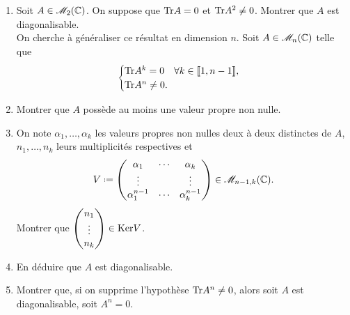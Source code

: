 \begin{exercice}
    \begin{enumerate}
        \item Soit $A \in \mathscr{M}_2(\mathbb{C})$. On suppose que $\mathrm{Tr}{A} = 0$ et $\mathrm{Tr}{A}^2 \not=0$. Montrer que $A$ est diagonalisable. \\
        On cherche à généraliser ce résultat en dimension $n$. Soit $A \in \mathscr{M}_n(\mathbb{C})$ telle que
        $$
        \begin{cases}
            \mathrm{Tr}{A^k}= 0 \quad \forall k \in \llbracket 1, n-1 \rrbracket, \\
            \mathrm{Tr}{A^n}\not=0.
        \end{cases}
        $$
        \item Montrer que $A$ possède au moins une valeur propre non nulle. 
        \item On note $\alpha_1, \dots, \alpha_k$ les valeurs propres non nulles deux à deux distinctes de $A$, $n_1, \dots, n_k$ leurs multiplicités respectives et 
        $$
        V \defeq \begin{pmatrix}
            \alpha_1 & \cdots & \alpha_k \\
            \vdots & & \vdots \\
            \alpha_1^{n-1} & \cdots & \alpha_k^{n-1}
        \end{pmatrix}
        \in \M_{n-1,k}(\C).
        $$
        Montrer que $\begin{pmatrix} n_1  \\ \vdots \\ n_k \end{pmatrix} \in \mathrm{Ker}{V}$.
        \item En déduire que $A$ est diagonalisable.
        \item Montrer que, si on supprime l'hypothèse $\mathrm{Tr}{A^n} \not=0$, alors soit $A$ est diagonalisable, soit $A^n = 0$.
    \end{enumerate}
\end{exercice}

\newcommand{\vandermondepartiel}{
\left(\begin{gathered}
    \tikzpicture[every node/.style={anchor=south west}]
        \node[minimum width=1.5cm,minimum height=0.5cm] at (0.125,1.25) {\LARGE $V_k$};
        
        \node[minimum width=0.5cm,minimum height=0.5cm] at (0,0) {$\star$};
        \node[minimum width=0.5cm,minimum height=0.5cm] at (0.55,0) {$\cdots$};
        \node[minimum width=0.5cm,minimum height=0.5cm] at (1.25,0) {$\star$};
        
        \node[minimum width=0.5cm,minimum height=0.5cm] at (0,0.375) {$\vdots$};
        \node[minimum width=0.5cm,minimum height=0.5cm] at (1.25,0.375) {$\vdots$};
        
        \node[minimum width=0.5cm,minimum height=0.5cm] at (0,0.75) {$\star$};
        \node[minimum width=0.5cm,minimum height=0.5cm] at (0.55,0.75) {$\cdots$};
        \node[minimum width=0.5cm,minimum height=0.5cm] at (1.25,0.75) {$\star$};

        \draw (0, 1.25) -- (1.75, 1.25);
    \endtikzpicture
    \end{gathered}\right)
}

